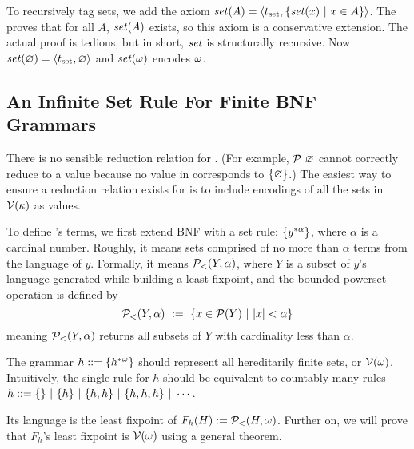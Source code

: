 To recursively tag sets, we add the axiom $\mathit{set}(A) = \langle{t_\mathrm{set}, \lbrace {\mathit{set}(x)} \ \lvert\ {x \in A} \rbrace}\rangle$. The  proves that for all $A$, $\mathit{set}(A)$ exists, so this axiom is a conservative extension. The actual proof is tedious, but in short, $\mathit{set}$ is structurally recursive. Now $\mathit{set}(\varnothing) = \langle{t_\mathrm{set},\varnothing}\rangle$ and $\mathit{set}(\omega)$ encodes $\omega$.

\subsection{An Infinite Set Rule For Finite BNF Grammars}

\newcommand{\setkleene}[2]{\ensuremath{\set{{#1}^{*{#2}}}}}

There is no sensible reduction relation for \ftargetlang. (For example, $\mathcal{P}~\varnothing$ cannot correctly reduce to a value because no value in \ftargetlang corresponds to $\{{\varnothing}\}$.) The easiest way to ensure a reduction relation exists for \targetlang is to include encodings of all the sets in $\mathcal{V}(\kappa)$ as values.

To define \targetlang's terms, we first extend BNF with a set rule: \setkleene{y}{\alpha}, where $\alpha$ is a cardinal number. Roughly, it means sets comprised of no more than $\alpha$ terms from the language of $y$.
Formally, it means $\mathcal{P}_<(Y,\alpha)$, where $Y$ is a subset of $y$'s language generated while building a least fixpoint, and the bounded powerset operation is defined by
\begin{equation}
	\mathcal{P}_<(Y,\alpha)\ :=\ \lbrace {x \in \mathcal{P}(Y)} \ \lvert\ {|x| < \alpha} \rbrace
\end{equation}
meaning $\mathcal{P}_<(Y,\alpha)$ returns all subsets of $Y$ with cardinality less than $\alpha$.

\begin{example}
The grammar $h ::= \setkleene{h}{\omega}$ should represent all hereditarily finite sets, or $\mathcal{V}(\omega)$. Intuitively, the single rule for $h$ should be equivalent to countably many rules $h ::= \{{}\} \ |\  \{{h}\} \ |\  \{{h,h}\} \ |\  \{{h,h,h}\} \ |\  \cdots$.

Its language is the least fixpoint of $F_h(H) := \mathcal{P}_<(H,\omega)$. Further on, we will prove that $F_h$'s least fixpoint is $\mathcal{V}(\omega)$ using a general theorem.
\exampleqed
\end{example}


